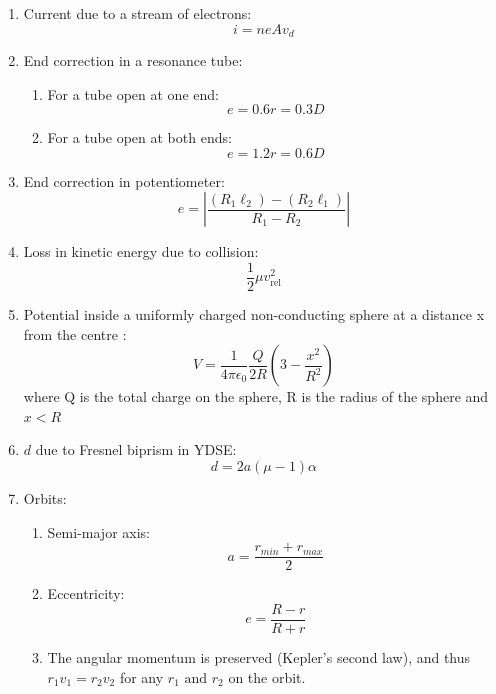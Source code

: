 \documentclass{article}
\numberwithin{equation}{section}
\numberwithin{figure}{section}
\begin{document}
\begin{enumerate}
\begin{enumerate}
		\end{enumerate}
	\item Current due to a stream of electrons:
		\begin{equation}
			i=ne A v_{d}	
		\end{equation}
	\item End correction in a resonance tube:
		\begin{enumerate}
			\item For a tube open at one end: $$e=0.6 r=0.3 D$$
			\item For a tube open at both ends: $$e=1.2 r=0.6 D$$
		\end{enumerate}
	\item End correction in potentiometer:
		\begin{equation}
		e=\left | \frac{(R_1\ell_2)-(R_2\ell_1)}{R_1-R_2}\right |
		\end{equation}
	\item Loss in kinetic energy due to collision:
		\begin{equation}
			\frac{1}{2}\mu v_{\text{rel}}^2
		\end{equation}
	\item Potential inside a uniformly charged non-conducting sphere at a distance x from the centre :
		\begin{equation}
			V=\frac{1}{4\pi \epsilon_0} \frac{Q}{2R}(3-\frac{x^2}{R^2})
		\end{equation}
		where Q is the total charge on the sphere, R is the radius of the sphere and $x<R$ 
	\item $d$ due to Fresnel biprism in YDSE:
		\begin{equation}
			d=2a(\mu-1)\alpha
		\end{equation}
	\item Orbits:
		\begin{enumerate}
			\item Semi-major axis:
				\begin{equation}
					a=\frac{r_{min}+r_{max}}{2}
				\end{equation}
			\item Eccentricity:
				\begin{equation}
					e=\frac{R-r}{R+r}
				\end{equation}
			\item The angular momentum is preserved (Kepler's second law), and thus $r_1 v_1= r_2 v_2$ for any $r_1 \text{ and } r_2$ on the orbit.
		\end{enumerate}
\end{enumerate}
\end{document}
